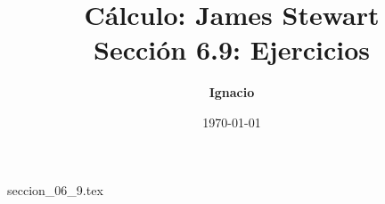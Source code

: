 \documentclass[11pt,spanish,oneside]{report}
\title{\textbf{Cálculo: James Stewart} \\ \Large Sección 6.9: Ejercicios}
\author{\textbf{Ignacio}}
\date{\today}
\begin{document}
\maketitle

{seccion_06_9.tex}
\end{document}
